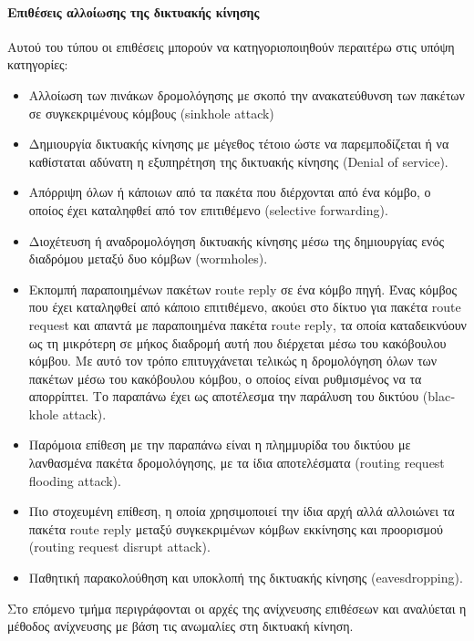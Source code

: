 \documentclass[12pt]{report}
\begin{document}
\paragraph{Επιθέσεις αλλοίωσης της δικτυακής κίνησης}
Αυτού του τύπου οι επιθέσεις μπορούν να κατηγοριοποιηθούν περαιτέρω στις υπόψη κατηγορίες:
\begin{itemize}
  \item Αλλοίωση των πινάκων δρομολόγησης με σκοπό την ανακατεύθυνση των πακέτων σε συγκεκριμένους κόμβους (\textlatin{sinkhole attack})
  \item Δημιουργία δικτυακής κίνησης με μέγεθος τέτοιο ώστε να παρεμποδίζεται ή να καθίσταται αδύνατη η εξυπηρέτηση της δικτυακής κίνησης (\textlatin{Denial of service}).
  \item Απόρριψη όλων ή κάποιων από τα πακέτα που διέρχονται από ένα κόμβο, ο οποίος έχει καταληφθεί από τον επιτιθέμενο (\textlatin{selective forwarding}).
  \item Διοχέτευση ή αναδρομολόγηση δικτυακής κίνησης μέσω της δημιουργίας ενός διαδρόμου μεταξύ δυο κόμβων (\textlatin{wormholes}).
  \item Εκπομπή παραποιημένων πακέτων \textlatin{route reply} σε ένα κόμβο πηγή. Ένας κόμβος που έχει καταληφθεί από κάποιο επιτιθέμενο, ακούει στο δίκτυο για πακέτα \textlatin{route request} και απαντά με παραποιημένα πακέτα \textlatin{route reply}, τα οποία καταδεικνύουν ως τη μικρότερη σε μήκος διαδρομή αυτή που διέρχεται μέσω του κακόβουλου κόμβου. Με αυτό τον τρόπο επιτυγχάνεται τελικώς η δρομολόγηση όλων των πακέτων μέσω του κακόβουλου κόμβου, ο οποίος είναι ρυθμισμένος να τα  απορρίπτει. Το παραπάνω έχει ως αποτέλεσμα την παράλυση του δικτύου (\textlatin{blackhole attack}).
  \item Παρόμοια επίθεση με την παραπάνω είναι η πλημμυρίδα του δικτύου με λανθασμένα πακέτα δρομολόγησης, με τα ίδια αποτελέσματα (\textlatin{routing request flooding attack}).
  \item Πιο στοχευμένη επίθεση, η οποία χρησιμοποιεί την ίδια αρχή αλλά αλλοιώνει τα πακέτα \textlatin{route reply} μεταξύ συγκεκριμένων κόμβων εκκίνησης και προορισμού (\textlatin{routing request disrupt attack}).
  \item Παθητική παρακολούθηση και υποκλοπή της δικτυακής κίνησης (\textlatin{eavesdropping}).
\end{itemize}

Στο επόμενο τμήμα περιγράφονται οι αρχές της ανίχνευσης επιθέσεων και αναλύεται η μέθοδος ανίχνευσης με βάση τις ανωμαλίες στη δικτυακή κίνηση.
\end{document}
